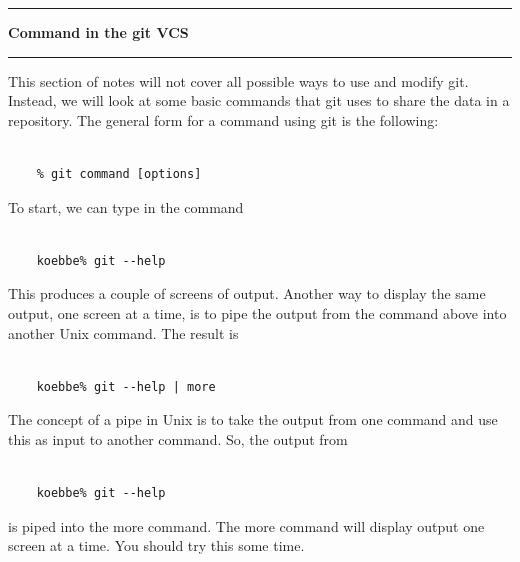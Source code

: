 \documentclass[10pt,fleqn]{article}
\begin{document}
\eject
\vskip0.1in\hrule\vskip0.1in\noindent
{\bf Command in the git VCS} 
\vskip0.1in\hrule\vskip0.1in\noindent
This section of notes will not cover all possible ways to use and modify git.
Instead, we will look at some basic commands that git uses to share the data in
a repository. The general form for a command using git is the following:
\begin{verbatim}

    % git command [options]

\end{verbatim}
To start, we can type in the command
\begin{verbatim}

    koebbe% git --help

\end{verbatim}
This produces a couple of screens of output. Another way to display the same
output, one screen at a time, is to pipe the output from the command above into
another Unix command. The result is
\begin{verbatim}

    koebbe% git --help | more

\end{verbatim}
The concept of a pipe in Unix is to take the output from one command and use
this as input to another command. So, the output from
\begin{verbatim}

    koebbe% git --help

\end{verbatim}
is piped into the more command. The more command will display output one screen
at a time. You should try this some time.
\end{document}
